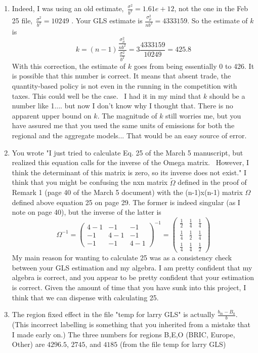 \documentclass{article}
\begin{document}
\begin{enumerate}
\item Indeed, I was using an old estimate,~$\frac{\sigma ^{2}}{b^{2}}%
=1.61e+12$, not the one in the Feb 25 file,~$\frac{\sigma ^{2}}{b^{2}}=10249$%
. Your GLS estimate is $\frac{\sigma _{\mu }^{2}}{nb^{2}}=4333159$. So the
estimate of $k$ is 
\[
k=\left( n-1\right) \frac{\frac{\sigma _{\mu }^{2}}{nb^{2}}}{\frac{\sigma
^{2}}{b^{2}}}=3\frac{4333159}{10249}=\allowbreak 425.\allowbreak 8
\]%
With this correction, the estimate of $k$ goes from being essentially 0 to
426. It is possible that this number is correct. It means that absent trade,
the quantity-based policy is not even in the running in the competition with
taxes. This could well be the case.~ I had it in my mind that $k$ should be
a number like 1.... but now I don't know why I thought that. There is no
apparent upper bound on $k.$ The magnitude of $k$ still worries me, but you
have assured me that you used the same units of emissions for both the
regional and the aggregate models... That would be an easy source of error.

\item You wrote "I just tried to calculate Eq. 25 of the March 5 manuscript,
but realized this equation calls for the inverse of the Omega matrix.~
However, I think the determinant of this matrix is zero, so its inverse does
not exist." I think that you might be confusing the nxn matrix $\tilde{\Omega%
}$ defined in the proof of Remark 1 (page 40 of the March 5 document) with
the (n-1)x(n-1) matrix $\Omega $ defined above equation 25 on page 29. The
former is indeed singular (as I note on page 40), but the inverse of the
latter is 
\[
\Omega ^{-1}=\left( 
\begin{array}{ccc}
4-1 & -1 & -1 \\ 
-1 & 4-1 & -1 \\ 
-1 & -1 & 4-1%
\end{array}%
\right) ^{-1}=\left( 
\begin{array}{ccc}
\frac{1}{2} & \frac{1}{4} & \frac{1}{4} \\ 
\frac{1}{4} & \frac{1}{2} & \frac{1}{4} \\ 
\frac{1}{4} & \frac{1}{4} & \frac{1}{2}%
\end{array}%
\right) 
\]%
My main reason for wanting to calculate 25 was as a consistency check
between your GLS estimation and my algebra. I am pretty confident that my
algebra is correct, and you appear to be pretty confident that your
estimation is correct. Given the amount of time that you have sunk into this
project, I think that we can dispense with calculating 25.

\item The region fixed effect in the file "temp for larry GLS" is actually $%
\frac{b_{0i}-B_{0}}{b}$. (This incorrect labelling is something that you
inherited from a mistake that I made early on.) The three numbers for
regions B,E,O (BRIC, Europe, Other) are $4296.5$, $2745$, and $4185$ (from
the file temp for larry GLS)
\end{enumerate}

\bigskip 

\bigskip 
\end{document}
